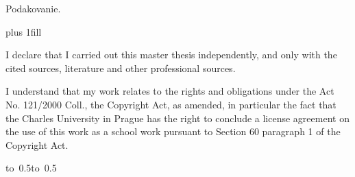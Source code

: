 \documentclass[12pt,a4paper]{report}
\let\openright=\clearpage
\begin{document}
\newpage



\openright

\noindent
Podakovanie.

\newpage


\vglue 0pt plus 1fill

\noindent
I declare that I carried out this master thesis independently, and only with the cited
sources, literature and other professional sources.

\medskip\noindent
I understand that my work relates to the rights and obligations under the Act No.
121/2000 Coll., the Copyright Act, as amended, in particular the fact that the Charles
University in Prague has the right to conclude a license agreement on the use of this
work as a school work pursuant to Section 60 paragraph 1 of the Copyright Act.

\vspace{10mm}

\hbox{\hbox to 0.5\hbox to 0.5}

\vspace{20mm}
\newpage

\end{document}
